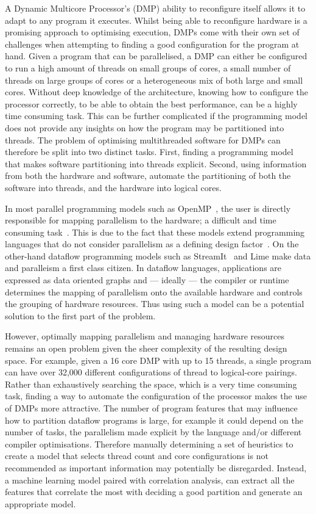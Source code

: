 A Dynamic Multicore Processor's (DMP) ability to reconfigure itself allows it to adapt to any program it executes.
Whilst being able to reconfigure hardware is a promising approach to optimising execution, DMPs come with their own set of challenges when attempting to finding a good configuration for the program at hand.
Given a program that can be parallelised, a DMP can either be configured to run a high amount of threads on small groups of cores, a small number of threads on large groups of cores or a heterogeneous mix of both large and small cores.
Without deep knowledge of the architecture, knowing how to configure the processor correctly, to be able to obtain the best performance, can be a highly time consuming task.
This can be further complicated if the programming model does not provide any insights on how the program may be partitioned into threads.
The problem of optimising multithreaded software for DMPs can therefore be split into two distinct tasks.
First, finding a programming model that makes software partitioning into threads explicit.
Second, using information from both the hardware and software, automate the partitioning of both the software into threads, and the hardware into logical cores.

In most parallel programming models such as OpenMP~\cite{openmp}, the user is directly responsible for mapping parallelism to the hardware; a difficult and time consuming task~\cite{prabhu2011LanguagePar}.
This is due to the fact that these models extend programming languages that do not consider parallelism as a defining design factor~\cite{pingaliTao2011}.
On the other-hand dataflow programming models such as StreamIt~\cite{theis2002streamit} and Lime \cite{auerbach2012lime} make data and paralleism a first class citizen.
In dataflow languages, applications are expressed as data oriented graphs and --- ideally --- the compiler or runtime determines the mapping of parallelism onto the available hardware and controls the grouping of hardware resources.
Thus using such a model can be a potential solution to the first part of the problem.

However, optimally mapping parallelism and managing hardware resources remains an open problem given the sheer complexity of the resulting design space.
For example, given a 16 core DMP with up to 15 threads, a single program can have over 32,000 different configurations of thread to logical-core pairings.
Rather than exhaustively searching the space, which is a very time consuming task, finding a way to automate the configuration of the processor makes the use of DMPs more attractive.
The number of program features that may influence how to partition dataflow programs is large, for example it could depend on the number of tasks, the parallelism made explicit by the language and/or different compiler optimisations.
Therefore manually determining a set of heuristics to create a model that selects thread count and core configurations is not recommended as important information may potentially be disregarded.
Instead, a machine learning model paired with correlation analysis, can extract all the features that correlate the most with deciding a good partition and generate an appropriate model.

